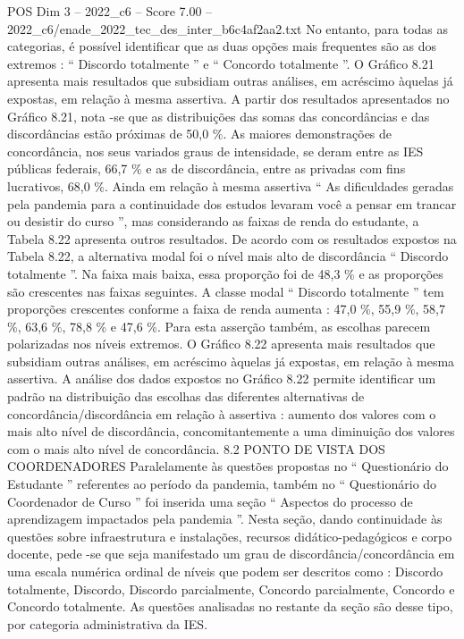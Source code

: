 \begin{textsample}{POS Dim 3 – 2022\_c6 – Score 7.00 – 2022\_c6/enade\_2022\_tec\_des\_inter\_b6c4af2aa2.txt}
No entanto, para todas as categorias, é possível identificar que as duas opções mais frequentes são as dos extremos : “ Discordo totalmente ” e “ Concordo totalmente ”.
O Gráfico 8.21 apresenta mais resultados que subsidiam outras análises, em acréscimo àquelas já expostas, em relação à mesma assertiva.
A partir dos resultados apresentados no Gráfico 8.21, nota -se que as distribuições das somas das concordâncias e das discordâncias estão próximas de 50,0 \%.
As maiores demonstrações de concordância, nos seus variados graus de intensidade, se deram entre as IES públicas federais, 66,7 \% e as de discordância, entre as privadas com fins lucrativos, 68,0 \%.
Ainda em relação à mesma assertiva “ As dificuldades geradas pela pandemia para a continuidade dos estudos levaram você a pensar em trancar ou desistir do curso ”, mas considerando as faixas de renda do estudante, a Tabela 8.22 apresenta outros resultados.
De acordo com os resultados expostos na Tabela 8.22, a alternativa modal foi o nível mais alto de discordância “ Discordo totalmente ”.
Na faixa mais baixa, essa proporção foi de 48,3 \% e as proporções são crescentes nas faixas seguintes.
A classe modal “ Discordo totalmente ” tem proporções crescentes conforme a faixa de renda aumenta : 47,0 \%, 55,9 \%, 58,7 \%, 63,6 \%, 78,8 \% e 47,6 \%.
Para esta asserção também, as escolhas parecem polarizadas nos níveis extremos.
O Gráfico 8.22 apresenta mais resultados que subsidiam outras análises, em acréscimo àquelas já expostas, em relação à mesma assertiva.
A análise dos dados expostos no Gráfico 8.22 permite identificar um padrão na distribuição das escolhas das diferentes alternativas de concordância/discordância em relação à assertiva : aumento dos valores com o mais alto nível de discordância, concomitantemente a uma diminuição dos valores com o mais alto nível de concordância. 8.2 PONTO DE VISTA DOS COORDENADORES Paralelamente às questões propostas no “ Questionário do Estudante ” referentes ao período da pandemia, também no “ Questionário do Coordenador de Curso ” foi inserida uma seção “ Aspectos do processo de aprendizagem impactados pela pandemia ”.
Nesta seção, dando continuidade às questões sobre infraestrutura e instalações, recursos didático-pedagógicos e corpo docente, pede -se que seja manifestado um grau de discordância/concordância em uma escala numérica ordinal de níveis que podem ser descritos como : Discordo totalmente, Discordo, Discordo parcialmente, Concordo parcialmente, Concordo e Concordo totalmente.
As questões analisadas no restante da seção são desse tipo, por categoria administrativa da IES.

\end{textsample}
